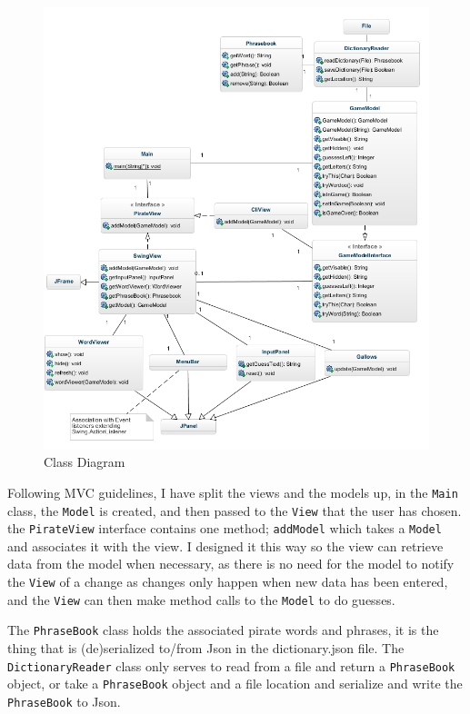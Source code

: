 \documentclass[a4paper, 11pt]{article}
\begin{document}
\begin{figure}[H]
\centering
\includegraphics[scale=0.6]{./res/ClassDiagram.jpg}
\caption{Class Diagram}
\label{ModelClassDiagram}
\end{figure}

Following MVC guidelines, I have split the views and the models up, in the \texttt{Main} class, the \texttt{Model} is created, and then passed to the \texttt{View} that the user has chosen. the \texttt{PirateView} interface contains one method; \texttt{addModel} which takes a \texttt{Model} and associates it with the view. I designed it this way so the view can retrieve data from the model when necessary, as there is no need for the model to notify the \texttt{View} of a change as changes only happen when new data has been entered, and the \texttt{View} can then make method calls to the \texttt{Model} to do guesses. 

The \texttt{PhraseBook} class holds the associated pirate words and phrases, it is the thing that is (de)serialized to/from Json in the dictionary.json file. The \texttt{DictionaryReader} class only serves to read from a file and return a \texttt{PhraseBook} object, or take a \texttt{PhraseBook} object and a file location and serialize and write the \texttt{PhraseBook} to Json.
\end{document}
